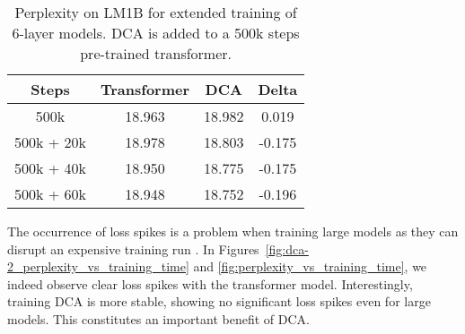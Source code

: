 \begin{table}[h]
    \vskip -0.1in
    \caption{Perplexity on LM1B for extended training of 6-layer models. DCA is added to a 500k steps pre-trained transformer.}
    \label{tab:lm1b_6_layer_fine_tuning}
    \vskip 0.15in
    \begin{center}
    \begin{small}
    \begin{sc}
    \begin{tabular}{c|ccc}
        \toprule
        Steps & Transformer & DCA & Delta \\
        \midrule
        500k & 18.963 & 18.982 & 0.019 \\
        500k + 20k & 18.978 & 18.803 & -0.175  \\
        500k + 40k & 18.950 & 18.775 & -0.175 \\
        500k + 60k & 18.948 & 18.752 & -0.196 \\
        \bottomrule
    \end{tabular}
    \end{sc}
    \end{small}
    \end{center}
    \vskip -0.1in
\end{table}

The occurrence of loss spikes is a problem when training large models as they can disrupt an expensive training run \citep{chowdhery2023palm}. In Figures~\ref{fig:dca-2_perplexity_vs_training_time} and \ref{fig:perplexity_vs_training_time}, we indeed observe clear loss spikes with the transformer model. Interestingly, training DCA is more stable, showing no significant loss spikes even for large models. This constitutes an important benefit of DCA.

